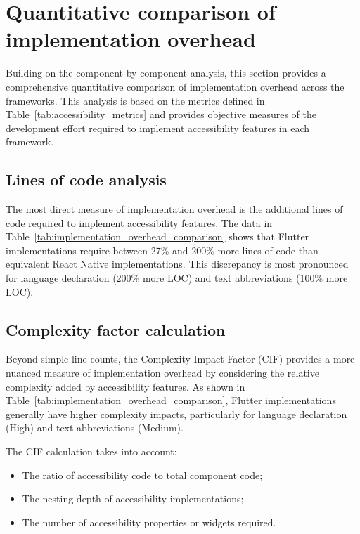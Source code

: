 \section{Quantitative comparison of implementation overhead}
\label{sec:quantitative-comparison}

Building on the component-by-component analysis, this section provides a comprehensive quantitative comparison of implementation overhead across the frameworks. This analysis is based on the metrics defined in Table~\ref{tab:accessibility_metrics} and provides objective measures of the development effort required to implement accessibility features in each framework.

\subsection{Lines of code analysis}
\label{subsec:loc-analysis}

The most direct measure of implementation overhead is the additional lines of code required to implement accessibility features. The data in Table~\ref{tab:implementation_overhead_comparison} shows that Flutter implementations require between 27\% and 200\% more lines of code than equivalent React Native implementations. This discrepancy is most pronounced for language declaration (200\% more LOC) and text abbreviations (100\% more LOC).

\subsection{Complexity factor calculation}
\label{subsec:complexity-factor}

Beyond simple line counts, the Complexity Impact Factor (CIF) provides a more nuanced measure of implementation overhead by considering the relative complexity added by accessibility features. As shown in Table~\ref{tab:implementation_overhead_comparison}, Flutter implementations generally have higher complexity impacts, particularly for language declaration (High) and text abbreviations (Medium).

The CIF calculation takes into account:
\begin{itemize}
    \item The ratio of accessibility code to total component code;
    \item The nesting depth of accessibility implementations;
    \item The number of accessibility properties or widgets required.
\end{itemize}

